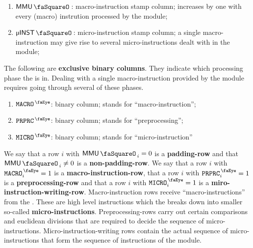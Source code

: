 \begin{enumerate}
	\item $\mmuStamp$:
		macro-instruction stamp column; increases by one with every (macro) instrution processed by the \mmuMod{} module; 
	\item $\microStamp$:
		micro-instruction stamp column; a single macro-instruction may give rise to several micro-instructions dealt with in the \mmioMod{} module;
\end{enumerate}
The following are \textbf{exclusive binary columns}.
They indicate which processing phase the \mmuMod{} is in.
Dealing with a single macro-instruction provided by the \hubMod{} module requires going through several of these phases.
\begin{enumerate}[resume]
	\item $\isMacro$:
		binary column;
		\mmuMacroInstructionSymbol{} stands for ``macro-instruction'';
	\item $\isPreprocessing$:
		binary column;
		\mmuPreprocessingSymbol{} stands for ``preprocessing'';
	\item $\isMicro$:
		binary column;
		\mmuMicroInstructionSymbol{} stands for ``micro-instruction''
\end{enumerate}
We say that a row $i$ with
$\mmuStamp_{i} =    0$ is a \textbf{padding-row} and that 
$\mmuStamp_{i} \neq 0$ is a \textbf{non-padding-row}.
We say that a row $i$ with  $\isMacro_{i} = 1$         is a \textbf{macro-instruction-row},
that a row $i$ with         $\isPreprocessing_{i} = 1$ is a \textbf{preprocessing-row}
and that a row $i$ with     $\isMicro_{i} = 1$         is a \textbf{miro-instruction-writing-row}.
Macro-instruction rows receive ``macro-instructions'' from the \hubMod{}. These are high level instructions which the \mmuMod{} breaks down into smaller so-called \textbf{micro-instructions}.
Preprocessing-rows carry out certain comparisons and euclidean divisions that are required to decide the sequence of micro-instructions.
Micro-instruction-writing rows contain the actual sequence of micro-instructions that form the sequence of instructions of the \mmioMod{} module. 

